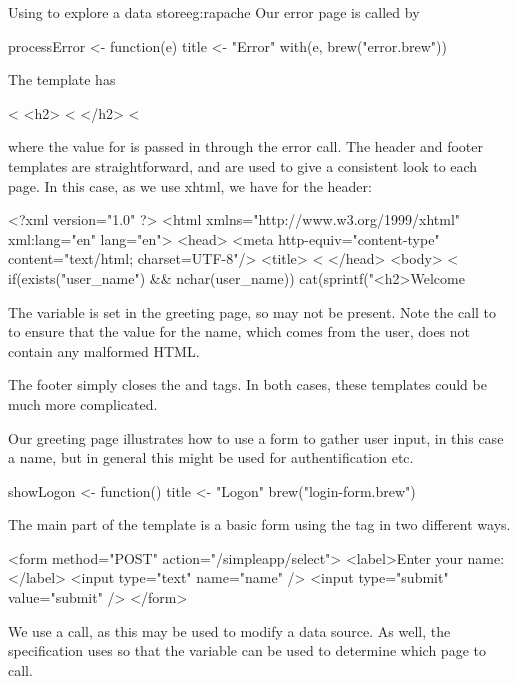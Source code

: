 \begin{example}{Using  to explore a data store}{eg:rapache}
Our error page is called by
\begin{Schunk}
\begin{Sinput}
 processError <- function(e) {
   title <- "Error"
   with(e, brew("error.brew"))
 }
\end{Sinput}
\end{Schunk}
The  template has
\begin{HTMLinput}
<%
<h2>
  <%
</h2>
<%
\end{HTMLinput}
where the value for  is passed in through the error
call. The header and footer templates are straightforward, and are
used to give a consistent look to each page. In this case, as we use
xhtml, we have for the header:
\begin{HTMLinput}
<?xml version="1.0" ?>
<html xmlns="http://www.w3.org/1999/xhtml" xml:lang="en" 
  lang="en">
<head>
<meta http-equiv="content-type" 
  content="text/html; charset=UTF-8"/>
<title> <%
</head>
<body>
<%
  if(exists("user_name") && nchar(user_name)) 
    cat(sprintf("<h2>Welcome %
\end{HTMLinput}
The  variable is set in the greeting page, so may
not be present. Note the call to  to ensure that the
value for the name, which comes from the user, does not contain any
malformed HTML. 

The footer simply closes the  and  tags. In both
cases, these templates could be much more complicated.

Our greeting page illustrates how to use a form to gather user input, in this case a name, but in general this might be used for authentification etc.
\begin{Schunk}
\begin{Sinput}
 showLogon <- function() {
   title <- "Logon"
   brew("login-form.brew")
 }
\end{Sinput}
\end{Schunk}
The main part of the  template is a basic form using the
 tag in two different ways.
\begin{HTMLinput}
<form method="POST" action="/simpleapp/select">
<label>Enter your name:</label>
<input type="text" name="name" />
<input type="submit" value="submit" />
</form>
\end{HTMLinput}
We use a  call, as this may be used to modify a data
source. As well, the  specification uses  so
that the  variable can be used to determine which
page to call.



\end{example}
